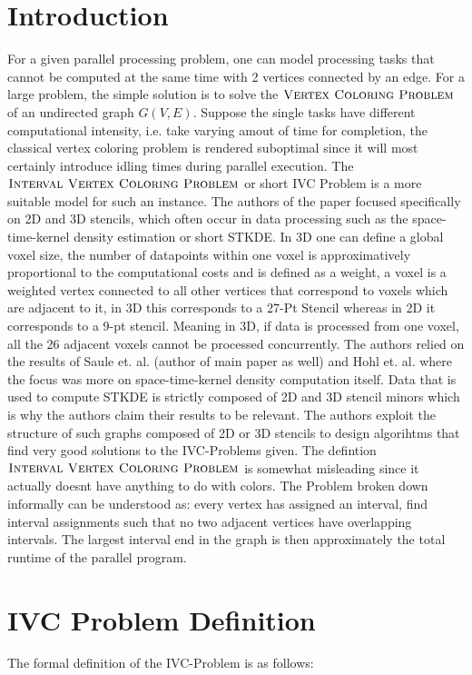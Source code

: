 \documentclass[sigconf]{acmart}
\begin{document}
\section{Introduction}
For a given parallel processing problem, one can model processing tasks that cannot be computed
at the same time with 2 vertices connected by an edge. For a large problem, the simple solution is to
solve the $\textsc{Vertex Coloring Problem}$ of an undirected graph $G(V,E)$. Suppose the single tasks have different 
computational intensity, i.e. take varying amout of time for completion, the classical vertex coloring
problem is rendered suboptimal since it will most certainly introduce idling times during parallel
execution. The $\textsc{Interval Vertex Coloring Problem}$ or short IVC Problem is a more suitable
model for such an instance. The authors of the paper focused specifically on 2D and 3D stencils,
which often occur in data processing such as the space-time-kernel density estimation or short STKDE. 
In 3D one can define a global voxel size, the number of datapoints within one voxel is approximatively 
proportional to the computational costs and is defined as a weight, a voxel is a weighted vertex connected
to all other vertices that correspond to voxels which are adjacent to it, in 3D this corresponds
to a 27-Pt Stencil whereas in 2D it corresponds to a 9-pt stencil. Meaning in 3D, if data is processed
from one voxel, all the 26 adjacent voxels cannot be processed concurrently. The authors relied on
the results of Saule et. al. \cite{kernel_estimation_2} (author of main paper as well) and 
Hohl et. al. \cite{kernel_estimation_1} where the focus was more on space-time-kernel density computation itself.  
Data that is used to compute STKDE is strictly composed of 2D and 3D stencil minors
which is why the authors claim their results to be relevant. The authors exploit the structure of
such graphs composed of 2D or 3D stencils to design algorihtms that find very good solutions to the 
IVC-Problems given. The defintion $\textsc{Interval Vertex Coloring Problem}$ is somewhat misleading
since it actually doesnt have anything to do with colors. The Problem broken down informally can
be understood as: every vertex has assigned an interval, find interval assignments such that no
two adjacent vertices have overlapping intervals. The largest interval end in the graph is then
approximately the total runtime of the parallel program.


\section{IVC Problem Definition}
The formal definition of the IVC-Problem is as follows: \\
\end{document}
